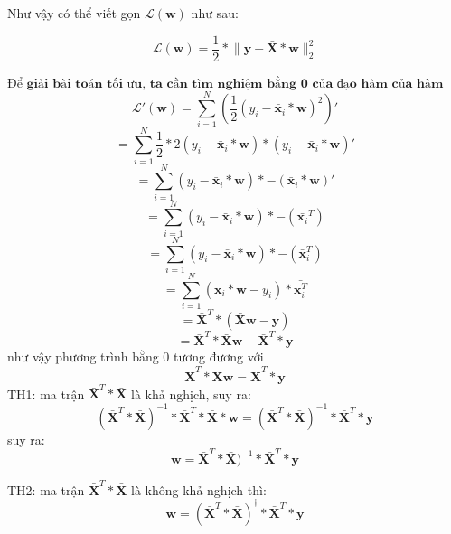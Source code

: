 \documentclass[12pt,letterpaper]{article}
\begin{document}
    Như vậy có thể viết gọn $\mathcal{L}(\textbf{w})$ như sau:
        
        $$
        \mathcal{L}(\textbf{w}) 
        = 
        \frac{1}{2} * 
        \lVert 
            \textbf{y} - \bar{\textbf{X}}*\textbf{w}
        \rVert_2^2
        $$
    
    $ \textbf{Để giải bài toán tối ưu, ta cần tìm nghiệm bằng 0 của đạo hàm của hàm mất mát: } $
        $$
            \mathcal{L}'(\textbf{w}) = \sum_{i=1}^N (\frac{1}{2} (y_i - \bar{\textbf{x}}_i*\textbf{w})^2)'
        $$
        $$
            = \sum_{i=1}^N  \frac{1}{2} * 2(y_i - \bar{\textbf{x}}_i*\textbf{w}) * (y_i - \bar{\textbf{x}}_i*\textbf{w})' 
        $$
        $$
            = \sum_{i=1}^N  (y_i - \bar{\textbf{x}}_i*\textbf{w}) * -(\bar{\textbf{x}}_i * \textbf{w})'
        $$
        $$
            = \sum_{i=1}^N  (y_i - \bar{\textbf{x}}_i*\textbf{w}) * -( \bar{\textbf{x}_i}^T)
        $$
        $$
            = \sum_{i=1}^N  (y_i - \bar{\textbf{x}}_i*\textbf{w}) * -( \bar{\textbf{x}}_i^T)
        $$
        $$
            = \sum_{i=1}^N  (\bar{\textbf{x}}_i*\textbf{w} - y_i) * \bar{\textbf{x}_i^T}
        $$
        $$
            = \bar{\textbf{X}}^T * (\bar{\textbf{X}}\textbf{w} - \textbf{y})
        $$
        $$
            = \bar{\textbf{X}}^T * \bar{\textbf{X}}\textbf{w} - \bar{\textbf{X}}^T * \textbf{y}
        $$
    như vậy phương trình bằng 0 tương đương với
        $$
            \bar{\textbf{X}}^T * \bar{\textbf{X}}\textbf{w} = \bar{\textbf{X}}^T * \textbf{y}
        $$
    TH1: ma trận $\bar{\textbf{X}}^T * \bar{\textbf{X}}$ là khả nghịch, suy ra:
        $$
            (\bar{\textbf{X}}^T * \bar{\textbf{X}}) ^{-1} * \bar{\textbf{X}}^T * \bar{\textbf{X}} * \textbf{w} = (\bar{\textbf{X}}^T * \bar{\textbf{X}}) ^{-1} * \bar{\textbf{X}}^T * \textbf{y}
        $$
    suy ra:
        $$
             \textbf{w} = \bar{\textbf{X}}^T * \bar{\textbf{X}}) ^{-1} * \bar{\textbf{X}}^T * \textbf{y}
        $$
    
    TH2: ma trận $\bar{\textbf{X}}^T * \bar{\textbf{X}}$ là không khả nghịch thì:
        $$
            \textbf{w} = (\bar{\textbf{X}}^T * \bar{\textbf{X}}) ^{\dagger} * \bar{\textbf{X}}^T * \textbf{y}
        $$
\end{document}
